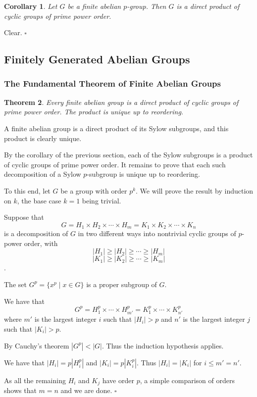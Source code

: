 \documentclass[10pt]{article}
\newtheorem{theorem}{Theorem}[section]
\newtheorem{corollary}[theorem]{Corollary}
\newenvironment{proof}[1][Proof]{\begin{trivlist}
\item[\hskip \labelsep {\itshape #1}]}{\end{trivlist}}
\begin{document}
\begin{corollary}
Let $G$ be a finite abelian $p$-group. Then $G$ is a direct product of cyclic groups of prime power order.
\end{corollary}

\begin{proof}
Clear. $\square$
\end{proof}

\subsection{Finitely Generated Abelian Groups}

\subsubsection{The Fundamental Theorem of Finite Abelian Groups}

\begin{theorem}
Every finite abelian group is a direct product of cyclic groups of prime power order. The product is unique up to reordering.
\end{theorem}

\begin{proof}
A finite abelian group is a direct product of its Sylow subgroups, and this product is clearly unique.

By the corollary of the previous section, each of the Sylow subgroups is a product of cyclic groups of prime power order. It remains to prove that each such decomposition of a Sylow $p$-subgroup is unique up to reordering.

To this end, let $G$ be a group with order $p^k$. We will prove the result by induction on $k$, the base case $k = 1$ being trivial.

Suppose that
$$G = H_1\times H_2\times \cdots \times H_m = K_1\times K_2 \times \cdots \times K_n$$
is a decomposition of $G$ in two different ways into nontrivial cyclic groups of $p$-power order, with
$$|H_1| \geq |H_2| \geq \cdots \geq |H_m|$$
$$|K_1| \geq |K_2| \geq \cdots \geq |K_m|$$.

The set $G^p = \{x^p \;|\; x \in G\}$ is a proper subgroup of $G$.

We have that
$$G^p = H_1^p\times \cdots \times H_{m'}^p = K_1^p \times \cdots \times K_{n'}^p$$
where $m'$ is the largest integer $i$ such that $|H_i| > p$ and $n'$ is the largest integer $j$ such that $|K_i| > p$.

By Cauchy's theorem $|G^p| < |G|$. Thus the induction hypothesis applies.

We have that $|H_i| = p|H_i^p|$ and $|K_i| = p|K_i^p|$. Thus $|H_i| = |K_i|$ for $i \leq m' = n'$.

As all the remaining $H_i$ and $K_j$ have order $p$, a simple comparison of orders shows that $m = n$ and we are done. $\square$
\end{proof}
\end{document}
